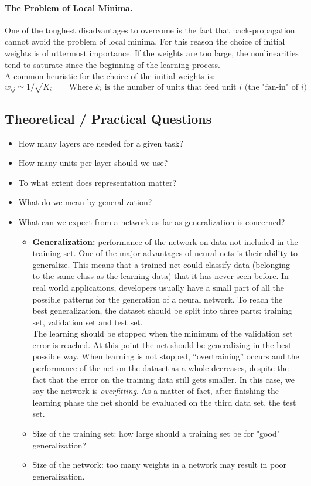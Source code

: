 \paragraph*{The Problem of Local Minima.} One of the toughest disadvantages to overcome is the fact that back-propagation cannot avoid the problem of local minima. For this reason the choice of initial weights is of uttermost importance. If the weights are too large, the nonlinearities tend to saturate since the beginning of the learning process. \\
A common heuristic for the choice of the initial weights is: 
$$w_{ij} \simeq 1/\sqrt{K_i} \qquad \text{Where } k_i \text{ is the number of units that feed unit }i \text{ (the "fan-in" of }i \text{)}$$

\subsection{Theoretical / Practical Questions}
\begin{itemize}
	\item How many layers are needed for a given task?
	\item How many units per layer should we use?
	\item To what extent does representation matter?
	\item What do we mean by generalization?
	\item What can we expect from a network as far as generalization is concerned?
	\begin{itemize}
		\item \textbf{Generalization:} performance of the network on data not included in the training set. One of the major advantages of neural nets is their ability to generalize. This means that a trained net could classify data (belonging to the same class as the learning data) that it has never seen before. In real world applications, developers usually have a small part of all the possible patterns for the generation of a neural network. To reach the best generalization, the dataset should be split into three parts: training set, validation set and test set.\\
		The learning should be stopped when the minimum of the validation set error is reached. At this point the net should be generalizing in the best possible way. When learning is not stopped, ``overtraining'' occurs and the performance of the net on the dataset as a whole decreases, despite the fact that the error on the training data still gets smaller. In this case, we say the network is \textit{overfitting}. As a matter of fact, after finishing the learning phase the net should be evaluated on the third data set, the test set.
		\item Size of the training set: how large should a training set be for "good" generalization?
		\item Size of the network: too many weights in a network may result in poor generalization.
	\end{itemize}
\end{itemize}

